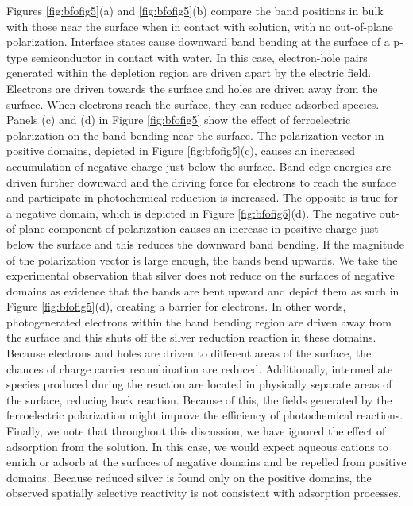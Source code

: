 Figures \ref{fig:bfofig5}(a) and \ref{fig:bfofig5}(b) compare the band positions in bulk
 with those near the surface when in contact with solution, with no
out-of-plane polarization. Interface states cause downward band bending at the surface of
a p-type semiconductor in contact with water.\cite{Morrison:1980va} In this case,
electron-hole pairs generated within the depletion region are driven apart by the electric
field. Electrons are driven towards the surface and holes are driven away from the
surface. When electrons reach the surface, they can reduce adsorbed species. Panels (c)
and (d) in Figure \ref{fig:bfofig5} show the effect of ferroelectric polarization on the
band bending near the surface. The polarization vector in positive domains, depicted in
Figure \ref{fig:bfofig5}(c), causes an increased accumulation of negative charge just
below the surface. Band edge energies are driven further downward and the driving force
for electrons to reach the surface and participate in photochemical reduction is
increased. The opposite is true for a negative domain, which is depicted in Figure
\ref{fig:bfofig5}(d). The negative out-of-plane component of polarization causes an
increase in positive charge just below the surface and this reduces the downward band
bending. If the magnitude of the polarization vector is large enough, the bands bend
upwards. We take the experimental observation that silver does not reduce on the surfaces
of negative domains as evidence that the bands are bent upward and depict them as such in
Figure \ref{fig:bfofig5}(d), creating a barrier for electrons. In other words,
photogenerated electrons within the band bending region are driven away from the surface
and this shuts off the silver reduction reaction in these domains. Because electrons and
holes are driven to different areas of the surface, the chances of charge carrier
recombination are reduced. Additionally, intermediate species produced during the reaction
are located in physically separate areas of the surface, reducing back reaction. Because
of this, the fields generated by the ferroelectric polarization might improve the
efficiency of photochemical reactions. Finally, we note that throughout this discussion,
we have ignored the effect of adsorption from the solution. In this case, we would expect
aqueous  cations to enrich or adsorb at the surfaces of negative domains and be
repelled from positive domains. Because reduced silver is found only on the positive
domains, the observed spatially selective reactivity is not consistent with adsorption
processes.


